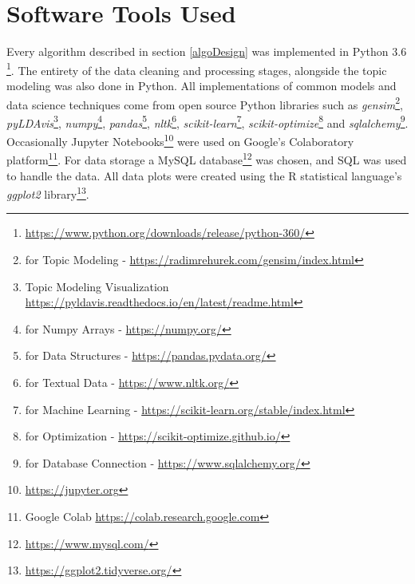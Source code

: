 \section{Software Tools Used}
    Every algorithm described in section \ref{algoDesign} was implemented in Python 3.6 \footnote{\url{https://www.python.org/downloads/release/python-360/}}. The entirety of the data cleaning and processing stages, alongside the topic modeling was also done in Python. All implementations of common models and data science techniques come from open source Python libraries such as \emph{gensim}\footnote{for Topic Modeling - \url{https://radimrehurek.com/gensim/index.html}}, \emph{pyLDAvis}\footnote{Topic Modeling Visualization \url{https://pyldavis.readthedocs.io/en/latest/readme.html}}, \emph{numpy}\footnote{for Numpy Arrays - \url{https://numpy.org/}}, \emph{pandas}\footnote{for Data Structures - \url{https://pandas.pydata.org/}}, \emph{nltk}\footnote{for Textual Data - \url{https://www.nltk.org/}}, \emph{scikit-learn}\footnote{for Machine Learning - \url{https://scikit-learn.org/stable/index.html}}, \emph{scikit-optimize}\footnote{for Optimization - \url{https://scikit-optimize.github.io/}} and \emph{sqlalchemy}\footnote{for Database Connection - \url{https://www.sqlalchemy.org/}}. Occasionally Jupyter Notebooks\footnote{\url{https://jupyter.org}} were used on Google's Colaboratory \cite{bisong2019google} platform\footnote{Google Colab \url{https://colab.research.google.com}}. For data storage a MySQL database\footnote{\url{https://www.mysql.com/}} was chosen, and SQL was used to handle the data. All data plots were created using the R \cite{team2013r} statistical language's \emph{ggplot2} \cite{wickham2016ggplot2} library\footnote{\url{https://ggplot2.tidyverse.org/}}.


    
